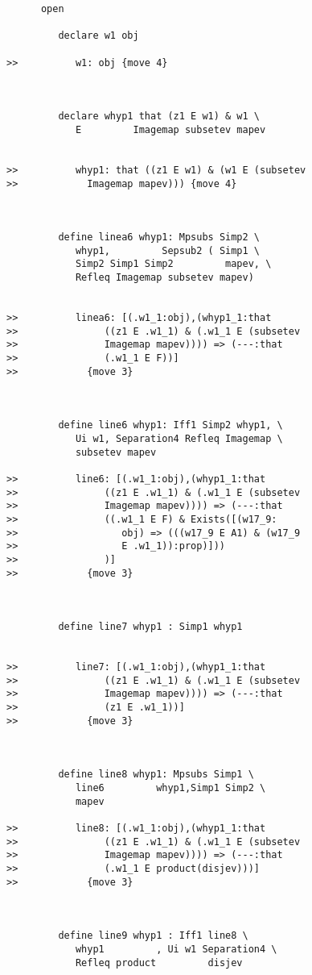 \documentclass[12pt]{article}
\begin{document}
\begin{verbatim}
      open

         declare w1 obj

>>          w1: obj {move 4}



         declare whyp1 that (z1 E w1) & w1 \
            E         Imagemap subsetev mapev


>>          whyp1: that ((z1 E w1) & (w1 E (subsetev
>>            Imagemap mapev))) {move 4}



         define linea6 whyp1: Mpsubs Simp2 \
            whyp1,         Sepsub2 ( Simp1 \
            Simp2 Simp1 Simp2         mapev, \
            Refleq Imagemap subsetev mapev)


>>          linea6: [(.w1_1:obj),(whyp1_1:that
>>               ((z1 E .w1_1) & (.w1_1 E (subsetev
>>               Imagemap mapev)))) => (---:that
>>               (.w1_1 E F))]
>>            {move 3}



         define line6 whyp1: Iff1 Simp2 whyp1, \
            Ui w1, Separation4 Refleq Imagemap \
            subsetev mapev

>>          line6: [(.w1_1:obj),(whyp1_1:that
>>               ((z1 E .w1_1) & (.w1_1 E (subsetev
>>               Imagemap mapev)))) => (---:that
>>               ((.w1_1 E F) & Exists([(w17_9:
>>                  obj) => (((w17_9 E A1) & (w17_9
>>                  E .w1_1)):prop)]))
>>               )]
>>            {move 3}



         define line7 whyp1 : Simp1 whyp1


>>          line7: [(.w1_1:obj),(whyp1_1:that
>>               ((z1 E .w1_1) & (.w1_1 E (subsetev
>>               Imagemap mapev)))) => (---:that
>>               (z1 E .w1_1))]
>>            {move 3}



         define line8 whyp1: Mpsubs Simp1 \
            line6         whyp1,Simp1 Simp2 \
            mapev

>>          line8: [(.w1_1:obj),(whyp1_1:that
>>               ((z1 E .w1_1) & (.w1_1 E (subsetev
>>               Imagemap mapev)))) => (---:that
>>               (.w1_1 E product(disjev)))]
>>            {move 3}



         define line9 whyp1 : Iff1 line8 \
            whyp1         , Ui w1 Separation4 \
            Refleq product         disjev



\end{verbatim}
\end{document}
